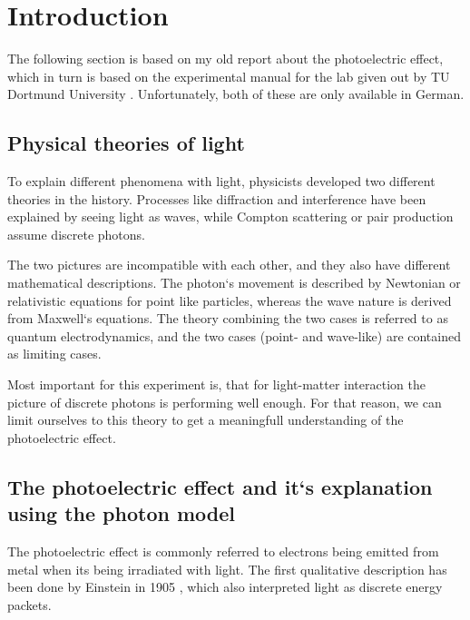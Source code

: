 \section{Introduction}
\label{sec:introduction}
The following section is based on my old report about the photoelectric effect, which in turn is
based on the experimental manual for the lab given out by TU Dortmund University \cite{V500}. Unfortunately,
both of these are only available in German.

\subsection{Physical theories of light}
\label{sec:intr:theory}
To explain different phenomena with light, physicists developed two different theories in the
history. Processes like diffraction and interference have been explained by seeing light as waves,
while Compton scattering or pair production assume discrete photons. 

The two pictures are incompatible with each other, and they also have different mathematical
descriptions. The photon`s movement is described by Newtonian or relativistic equations for
point like particles, whereas the wave nature is derived from Maxwell`s equations. The theory
combining the two cases is referred to as quantum electrodynamics, and the two cases (point- and 
wave-like) are contained as limiting cases.

Most important for this experiment is, that for light-matter interaction the picture of discrete
photons is performing well enough. For that reason, we can limit ourselves to this theory to get a
meaningfull understanding of the photoelectric effect.

\subsection{The photoelectric effect and it`s explanation using the photon model}
\label{sec:intr:photoeffect}
The photoelectric effect is commonly referred to electrons being emitted from metal when its being
irradiated with light. The first qualitative description has been done by Einstein in 1905
\cite{https://doi.org/10.1002/andp.19053220607}, which also interpreted light as discrete energy
packets.

